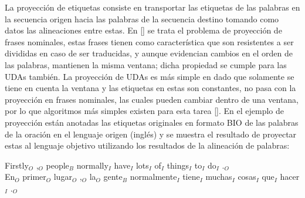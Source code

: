 La proyección de etiquetas consiste en transportar las etiquetas de las palabras en la secuencia origen
hacia las palabras de la secuencia destino tomando como datos las alineaciones entre estas. En [\cite{yarowsky2001inducing}]
se trata el problema de proyección de frases nominales, estas frases tienen como característica que son resistentes
a ser divididas en caso de ser traducidas, y aunque evidencian 
cambios en el orden de las palabras, mantienen la misma ventana; dicha propiedad se cumple para las UDAs también.
La proyección de UDAs es más simple en dado
que solamente se tiene en cuenta la ventana y las etiquetas en estas son constantes, no pasa con la proyección en
frases nominales, las cuales pueden cambiar dentro de una ventana, por lo que algoritmos más simples existen
para esta tarea [\cite{eger2018cross}]. En el ejemplo de proyección están anotadas las etiquetas originales en formato BIO
de las palabras de la oración en el lenguaje origen (inglés) y se muestra el
resultado de proyectar estas al lenguaje objetivo utilizando los resultados de la alineación de palabras:

\begin{adjustwidth}{25pt}{25pt}
	Firstly$_O$ ,$_O$ people$_B$ normally$_I$ have$_I$ lots$_I$ of$_I$ things$_I$ to$_I$ do$_I$ .$_O$ \\
	En$_O$ primer$_O$ lugar$_O$ ,$_O$ la$_O$ gente$_B$ normalmente$_I$ tiene$_I$ muchas$_I$ cosas$_I$ que$_I$ hacer$_I$ .$_O$
\end{adjustwidth}
